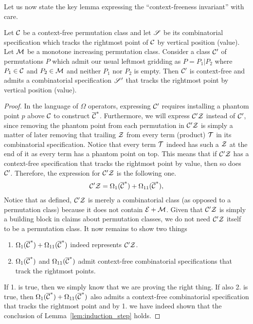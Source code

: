 \documentclass[12pt, a4paper, twoside]{report}
\begin{document}
Let us now state the key lemma expressing the ``context-freeness invariant'' with care.


\begin{lemma}
  \label{lem:induction_step}
  Let $\mathcal{C}$ be a context-free permutation class and let $\mathscr{S}$ be its combinatorial specification which tracks the rightmost point of $\mathcal{C}$ by vertical position (value). Let $\mathcal{M}$ be a monotone increasing permutation class. Consider a class $\mathcal{C}'$ of permutations $P$ which admit our usual leftmost gridding as $P=P_1|P_2$ where $P_1\in \mathcal{C}$ and $P_2\in \mathcal{M}$ and neither $P_1$ nor $P_2$ is empty. Then $\mathcal{C}'$ is context-free and admits a combinatorial specification $\mathscr{S}'$ that tracks the rightmost point by vertical position (value).
\end{lemma}
\begin{proof}
In the language of $\Omega$ operators, expressing $\mathcal{C}'$ requires installing a phantom point $p$ above $\mathcal{C}$ to construct $\overline{\mathcal{C}}^*$. Furthermore, we will express $\mathcal{C}'\mathcal{Z}$ instead of $\mathcal{C}'$, since removing the phantom point from each permutation in $\mathcal{C}'\mathcal{Z}$ is simply a matter of later removing that trailing $\mathcal{Z}$ from every term (product) $\mathcal{T}$ in its combinatorial specification. Notice that every term $\mathcal{T}$ indeed has such a $\mathcal{Z}$ at the end of it as every term has a phantom point on top. This means that if $\mathcal{C}'\mathcal{Z}$ has a context-free specification that tracks the rightmost point by value, then so does $\mathcal{C}'$. Therefore, the expression for $\mathcal{C}'\mathcal{Z}$ is the following one.
\begin{align}
  \mathcal{C}'\mathcal{Z} = \Omega_1(\overline{\mathcal{C}}^*) + \Omega_{11}(\overline{\mathcal{C}}^*),
  \label{eq:induction_step_expression}
\end{align}
Notice that as defined, $\mathcal{C}'\mathcal{Z}$ is merely a combinatorial class (as opposed to a permutation class) because it does not contain $\mathcal{E} + \mathcal{M}$. Given that $\mathcal{C}'\mathcal{Z}$ is simply a building block in claims about permutation classes, we do not need $\mathcal{C}'\mathcal{Z}$ itself to be a permutation class. It now remains to show two things
\begin{enumerate}
\item $\Omega_1(\overline{\mathcal{C}}^*) + \Omega_{11}(\overline{\mathcal{C}}^*)$ indeed represents $\mathcal{C}'\mathcal{Z}$.
\item $\Omega_1(\overline{\mathcal{C}}^*)$ and $\Omega_{11}(\overline{\mathcal{C}}^*)$ admit context-free combinatorial specifications that track the rightmost points.
\end{enumerate}
If 1. is true, then we simply know that we are proving the right thing. If also 2. is true, then $\Omega_1(\overline{\mathcal{C}}^*) + \Omega_{11}(\overline{\mathcal{C}}^*)$ also admits a context-free combinatorial specification that tracks the rightmost point and by 1. we have indeed shown that the conclusion of Lemma~\ref{lem:induction_step} holds.


\end{proof}
\end{document}
